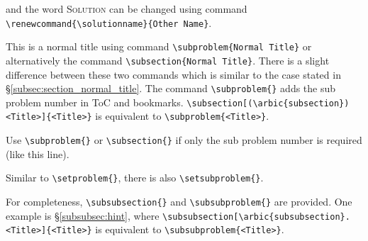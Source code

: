 \documentclass[oneside]{seu-ml-assign}
\begin{document}
    \startsolution[print]
    and the word \textsc{Solution} can be changed using command \verb|\renewcommand{\solutionname}{Other Name}|.



     This is a normal title using command \verb|\subproblem{Normal Title}| or alternatively the command \verb|\subsection{Normal Title}|.
    There is a slight difference between these two commands which is similar to the case stated in \S\ref{subsec:section_normal_title}.
    The command
    \verb|\subproblem{}| adds the sub problem number in ToC and bookmarks.
    \verb|\subsection[(\arbic{subsection}) <Title>]{<Title>}|
    is equivalent to \verb|\subproblem{<Title>}|.

    \subproblem{} Use \verb|\subproblem{}| or \verb|\subsection{}| if only the sub problem number is required (like this line).

     Similar to \verb|\setproblem{}|, there is also \verb|\setsubproblem{}|.

     For completeness,
    \verb|\subsubsection{}| and \verb|\subsubproblem{}| are provided.
    One example is \S\ref{subsubsec:hint}, where
    \verb|\subsubsection[\arbic{subsubsection}. <Title>]{<Title>}|
    is equivalent to \verb|\subsubproblem{<Title>}|.

\end{document}
